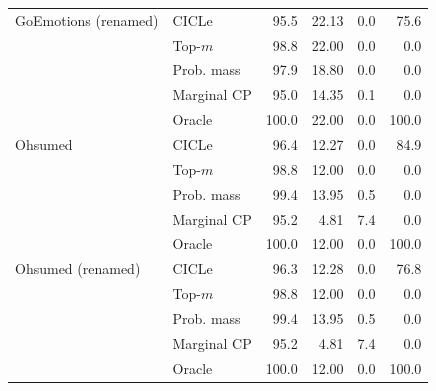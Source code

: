\begin{tabular}{llrrrr}
\addlinespace
GoEmotions (renamed) & CICLe & 95.5 & 22.13 & 0.0 & 75.6 \\
 & Top-$m$ & 98.8 & 22.00 & 0.0 & 0.0 \\
 & Prob. mass & 97.9 & 18.80 & 0.0 & 0.0 \\
 & Marginal CP & 95.0 & 14.35 & 0.1 & 0.0 \\
 & Oracle & 100.0 & 22.00 & 0.0 & 100.0 \\
\addlinespace
Ohsumed & CICLe & 96.4 & 12.27 & 0.0 & 84.9 \\
 & Top-$m$ & 98.8 & 12.00 & 0.0 & 0.0 \\
 & Prob. mass & 99.4 & 13.95 & 0.5 & 0.0 \\
 & Marginal CP & 95.2 & 4.81 & 7.4 & 0.0 \\
 & Oracle & 100.0 & 12.00 & 0.0 & 100.0 \\
\addlinespace
Ohsumed (renamed) & CICLe & 96.3 & 12.28 & 0.0 & 76.8 \\
 & Top-$m$ & 98.8 & 12.00 & 0.0 & 0.0 \\
 & Prob. mass & 99.4 & 13.95 & 0.5 & 0.0 \\
 & Marginal CP & 95.2 & 4.81 & 7.4 & 0.0 \\
 & Oracle & 100.0 & 12.00 & 0.0 & 100.0 \\
\bottomrule
\end{tabular}
